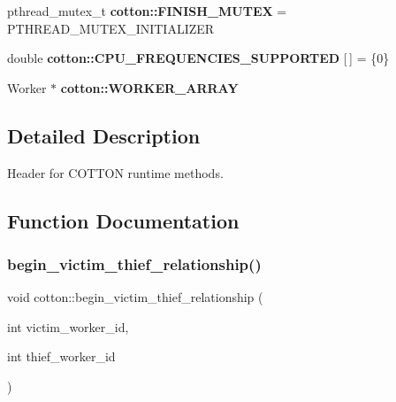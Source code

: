 \begin{DoxyCompactItemize}
\item 
\mbox{\label{cotton-runtime_8h_a0fa66e316877ba57e881d9c4fd193765}} 
pthread\+\_\+mutex\+\_\+t {\bfseries cotton\+::\+F\+I\+N\+I\+S\+H\+\_\+\+M\+U\+T\+EX} = P\+T\+H\+R\+E\+A\+D\+\_\+\+M\+U\+T\+E\+X\+\_\+\+I\+N\+I\+T\+I\+A\+L\+I\+Z\+ER
\item 
\mbox{\label{cotton-runtime_8h_a9495289cfdde14af0e4088dd212b892c}} 
double {\bfseries cotton\+::\+C\+P\+U\+\_\+\+F\+R\+E\+Q\+U\+E\+N\+C\+I\+E\+S\+\_\+\+S\+U\+P\+P\+O\+R\+T\+ED} \mbox{[}$\,$\mbox{]} = \{0\}
\item 
\mbox{\label{cotton-runtime_8h_a90bfbca05b124b3b7e18e43d3354ae4e}} 
Worker $\ast$ {\bfseries cotton\+::\+W\+O\+R\+K\+E\+R\+\_\+\+A\+R\+R\+AY}
\end{DoxyCompactItemize}


\subsection{Detailed Description}
Header for C\+O\+T\+T\+ON runtime methods. 



\subsection{Function Documentation}
\mbox{\label{cotton-runtime_8h_file_af567cb17aa6a653d9a567fb65f40b716}} 
\subsubsection{\texorpdfstring{begin\+\_\+victim\+\_\+thief\+\_\+relationship()}{begin\_victim\_thief\_relationship()}}
{\footnotesize\ttfamily void cotton\+::begin\+\_\+victim\+\_\+thief\+\_\+relationship (\begin{DoxyParamCaption}\item[{int}]{victim\+\_\+worker\+\_\+id,  }\item[{int}]{thief\+\_\+worker\+\_\+id }\end{DoxyParamCaption})}

